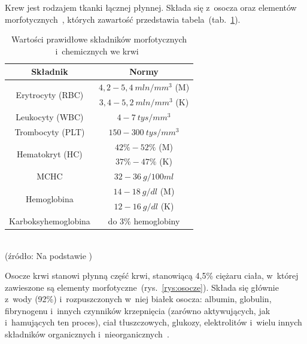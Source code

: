 Krew jest rodzajem tkanki łącznej płynnej. Składa się z~osocza oraz elementów morfotycznych~\cite{Fizj:2007}, których zawartość przedstawia 
tabela~(tab.~\ref{tab:Morfotyczne}).\\

\begin{table}[h]\large
	\caption{Wartości prawidłowe składników morfotycznych i~chemicznych we krwi~\cite{SzGa11}}
	\label{tab:Morfotyczne}
	\begin{center}
	\begin{tabular}{|c||c|c|}
	\hline
	Składnik & \multicolumn{2}{|c|}{Normy}	\\
	\hline \hline

	\multirow{2}{*}{Erytrocyty (RBC)} & \multicolumn{2}{|c|}{$4,2 - 5,4~ mln/mm^3$ (M)} \\
	\cline{2-3} & \multicolumn{2}{|c|}{$3,4 - 5,2~mln/mm^3$ (K)} \\ 
	\hline	

	Leukocyty (WBC) & \multicolumn{2}{|c|}{$4 - 7~tys/mm^3$} \\
	\hline

	Trombocyty (PLT) & \multicolumn{2}{|c|}{$150 - 300~tys/mm^3$} \\
	\hline
	\multirow{2}{*}{Hematokryt (HC)} & \multicolumn{2}{|c|}{$42\% - 52\%$ (M)} \\
	\cline{2-3} & \multicolumn{2}{|c|}{$37\% - 47\%$ (K)} \\
	\hline

	MCHC  & \multicolumn{2}{|c|}{$32 - 36~g/100 ml$}\\
	\hline
	\multirow{2}{*}{Hemoglobina} & \multicolumn{2}{|c|}{$14 - 18~g/dl$ (M)} \\ 
	\cline{2-3} & \multicolumn{2}{|c|}{$12 - 16~g/dl$ (K)} \\ 
	\hline

	Karboksyhemoglobina & \multicolumn{2}{|c|}{do 3\% hemoglobiny} \\
	\hline
	\end{tabular}
	\end{center}
	~\\
	(źródło: Na podstawie \cite{SzGa11})
\end{table}
Osocze krwi stanowi płynną część krwi, stanowiącą 4,5\% ciężaru ciała, w~której zawieszone są elementy morfotyczne~(rys.~\ref{rys:osocze}).
Składa się głównie z~wody (92\%) i~rozpuszczonych w~niej białek osocza: albumin, globulin, fibrynogenu i~innych czynników krzepnięcia (zarówno aktywujących, jak 
i~hamujących ten proces), ciał tłuszczowych, glukozy, elektrolitów i~wielu innych składników organicznych i~nieorganicznych~\cite{Fizj:2007}.

